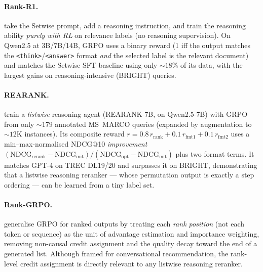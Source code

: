 \paragraph{Rank-R1.}
\citet{rl:zhuang2025rankr1} take the Setwise prompt, add a reasoning
instruction, and train the reasoning ability \emph{purely with RL} on relevance
labels (no reasoning supervision). On Qwen2.5 at 3B/7B/14B, GRPO uses a binary
reward (1 iff the output matches the \texttt{<think>}/\texttt{<answer>} format
\emph{and} the selected label is the relevant document) and matches the Setwise
SFT baseline using only ${\sim}18\%$ of its data, with the largest gains on
reasoning-intensive (BRIGHT) queries.

\paragraph{REARANK.}
\citet{rl:zhang2025rearank} train a \emph{listwise} reasoning agent
(REARANK-7B, on Qwen2.5-7B) with GRPO from only ${\sim}179$ annotated MS~MARCO
queries (expanded by augmentation to ${\sim}12$K instances). Its composite
reward $r = 0.8\,r_{\text{rank}} + 0.1\,r_{\text{fmt1}} + 0.1\,r_{\text{fmt2}}$
uses a min--max-normalised NDCG@10 \emph{improvement}
$(\mathrm{NDCG}_{\text{rerank}}-\mathrm{NDCG}_{\text{init}})/
(\mathrm{NDCG}_{\text{opt}}-\mathrm{NDCG}_{\text{init}})$ plus two format terms.
It matches GPT-4 on TREC DL19/20 and surpasses it on BRIGHT, demonstrating that a
listwise reasoning reranker --- whose permutation output is exactly a step
ordering --- can be learned from a tiny label set.

\paragraph{Rank-GRPO.}
\citet{rl:rankgrpo2025} generalise GRPO for ranked outputs by treating each
\emph{rank position} (not each token or sequence) as the unit of advantage
estimation and importance weighting, removing non-causal credit assignment and
the quality decay toward the end of a generated list. Although framed for
conversational recommendation, the rank-level credit assignment is directly
relevant to any listwise reasoning reranker.

